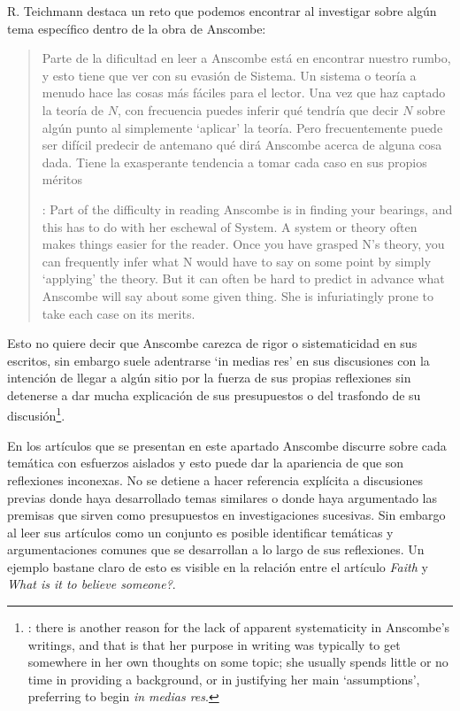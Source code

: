 R. Teichmann destaca un reto que podemos encontrar al investigar sobre algún tema específico dentro de la obra de Anscombe:
\blockquote[{\Cite[1]{teichmann2008ans}}: Part of the difficulty in reading Anscombe is in finding your bearings, and this has to do with her eschewal of System. A system or theory often makes things easier for the reader. Once you have grasped N's theory, you can frequently infer what N would have to say on some point by simply `applying' the theory. But it can often be hard to predict in advance what Anscombe will say about some given thing. She is infuriatingly prone to take each case on its merits.]
{Parte de la dificultad en leer a Anscombe está en encontrar nuestro rumbo, y esto tiene que ver con su evasión de Sistema. Un sistema o teoría a menudo hace las cosas más fáciles para el lector. Una vez que haz captado la teoría de $N$, con frecuencia puedes inferir qué tendría que decir $N$ sobre algún punto al simplemente \enquote*{aplicar} la teoría. Pero frecuentemente puede ser difícil predecir de antemano qué dirá Anscombe acerca de alguna cosa dada. Tiene la exasperante tendencia a tomar cada caso en sus propios méritos}. 
Esto no quiere decir que Anscombe carezca de rigor o sistematicidad en sus escritos, sin embargo suele adentrarse \enquote*{in medias res} en sus discusiones con la intención de llegar a algún sitio por la fuerza de sus propias reflexiones sin detenerse a dar mucha explicación de sus presupuestos o del trasfondo de su discusión\footnote{\Cite[Cf.][1]{teichmann2008ans}: \textelp{} there is another reason for the lack of apparent systematicity in Anscombe's writings, and that is that her purpose in writing was typically to get somewhere in her own thoughts on some topic; she usually spends little or no time in providing a background, or in justifying her main `assumptions', preferring to begin \emph{in medias res}.}.

En los artículos que se presentan en este apartado Anscombe discurre sobre cada temática con esfuerzos aislados y esto puede dar la apariencia de que son reflexiones inconexas. No se detiene a hacer referencia explícita a discusiones previas donde haya desarrollado temas similares o donde haya argumentado las premisas que sirven como presupuestos en investigaciones sucesivas. Sin embargo al leer sus artículos como un conjunto es posible identificar temáticas y argumentaciones comunes que se desarrollan a lo largo de sus reflexiones. Un ejemplo bastane claro de esto es visible en la relación entre el artículo \emph{Faith} y \emph{What is it to believe someone?}.

